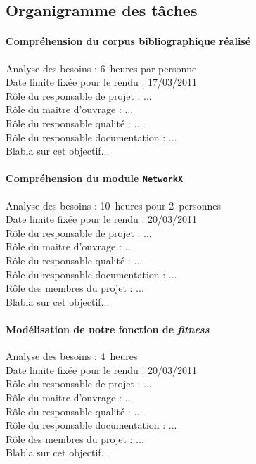\subsection{Organigramme des tâches}
\paragraph*{Compréhension du corpus bibliographique réalisé\\}
Analyse des besoins : 6~heures par personne\\
Date limite fixée pour le rendu : 17/03/2011\\
Rôle du responsable de projet : ...\\
Rôle du maitre d'ouvrage : ...\\
Rôle du responsable qualité : ...\\
Rôle du responsable documentation : ...\\
Blabla sur cet objectif...

\paragraph*{Compréhension du module \verb?NetworkX?\\}
Analyse des besoins : 10~heures pour 2~personnes\\
Date limite fixée pour le rendu : 20/03/2011\\
Rôle du responsable de projet : ...\\
Rôle du maitre d'ouvrage : ...\\
Rôle du responsable qualité : ...\\
Rôle du responsable documentation : ...\\
Rôle des membres du projet : ...\\
Blabla sur cet objectif...

\paragraph*{Modélisation de notre fonction de \textit{fitness}\\}
Analyse des besoins : 4~heures\\
Date limite fixée pour le rendu : 20/03/2011\\
Rôle du responsable de projet : ...\\
Rôle du maitre d'ouvrage : ...\\
Rôle du responsable qualité : ...\\
Rôle du responsable documentation : ...\\
Rôle des membres du projet : ...\\
Blabla sur cet objectif...

